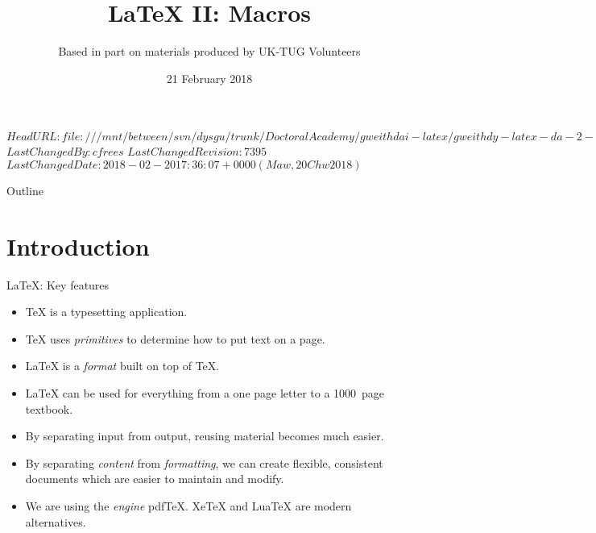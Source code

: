 \svnidlong
{$HeadURL: file:///mnt/between/svn/dysgu/trunk/DoctoralAcademy/gweithdai-latex/gweithdy-latex-da-2-macros/training.tex $}
{$LastChangedBy: cfrees $}
{$LastChangedRevision: 7395 $}
{$LastChangedDate: 2018-02-20 17:36:07 +0000 (Maw, 20 Chw 2018) $}



\title{\LaTeX{} II: Macros}
\subtitle{Based in part on materials produced by UK-TUG Volunteers}
\date{ 21 February 2018}




\begin{frame}
  \titlepage
\end{frame}

\maketitle


\tableofcontents

%
{
  \begin{frame}{Outline}
	\tableofcontents
  \end{frame}
}

\section{Introduction}

\begin{frame}{\LaTeX{}: Key features}

  \begin{itemize}
	\item \TeX{} is a typesetting application.
	\item \TeX{} uses \emph{primitives} to determine how to put text on a page.
	\item \LaTeX{} is  a \emph{format} built on top of \TeX{}.
	\item \LaTeX{} can be used for everything from a one page letter to a 1000~page textbook.
	\item By separating input from output, reusing material becomes much easier.
	\item By separating \emph{content} from \emph{formatting}, we can create flexible, consistent documents which are easier to maintain and modify.
	\item We are using the \emph{engine} pdf\TeX{}.
	Xe\TeX{} and Lua\TeX{} are modern alternatives.
  \end{itemize}

\end{frame}

